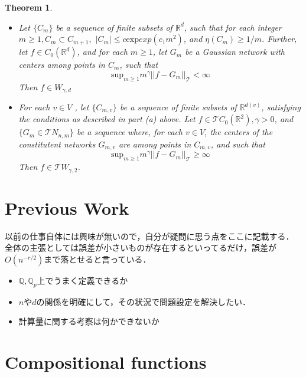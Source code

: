 \documentclass{ujarticle}
\newtheorem{thm}{Theorem}[section]
\begin{document}
\begin{thm}
  \begin{itemize}
    \item[(a)] Let $\{C_m\}$ be a sequence of finite subsets of $\mathbb{R}^d$,
    such that for each integer $m \ge 1, C_m \subset C_{m+1},$
    $|C_m| \le c \mathrm{exp}exp(c_1m^2)$, and $\eta (C_m) \ge 1/m$.
    Further, let $f \in C_0(\mathbb{R}^d)$, and for each $m \ge 1$,
    let $G_m$ be a Gaussian network with centers among points in $C_m$,
    such that
    \begin{equation*}
      \mathrm{sup}_{m \ge 1 } m^{ \gamma }||f -G_m||_{\mathcal{T}} < \infty
    \end{equation*}
 Then $f \in W_{\gamma,d}$
 \item[(b)]
 For each $v \in V$ , let $\{ C_{m,v} \}$ be a sequence of finite subsets of $\mathbb{R}^{d(v)}$, satisfying the conditions as described in part
 (a) above. Let $f \in  \mathcal{T}C_0(\mathbb{R}^2), \gamma> 0$, and $\{ G_m \in \mathcal{T}N_{n,m} \}$ be a sequence where, for each $v \in V$,
 the centers of the constitutent networks $G_{m,v}$ are among points in $C_{m,v}$, and such that
\begin{equation*}
\mathrm{sup}_{m \ge 1}m^{\gamma}||f -G_m||_{\mathcal{T}} \ge \infty
\end{equation*}
 Then $f \in \mathcal{T}W_{\gamma,2}$.
\end{itemize}
\end{thm}

\section{Previous Work}
\label{sec:Previous Work}
以前の仕事自体には興味が無いので，自分が疑問に思う点をここに記載する．
全体の主張としては誤差が小さいものが存在するといってるだけ，誤差が$O(n^{-r/2})$まで落とせると言っている．

\begin{itemize}
  \item $\mathbb{Q},\mathbb{Q}_p$上でうまく定義できるか
  \item $n$や$d$の関係を明確にして，その状況で問題設定を解決したい．
  \item 計算量に関する考察は何かできないか
\end{itemize}

\section{Compositional functions}
\label{sec:Compositional functions}
\end{document}
